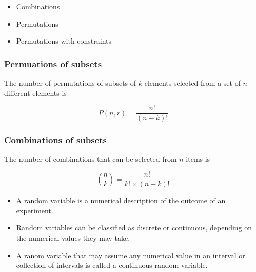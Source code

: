 \documentclass[IntroMain.tex]{subfiles}
\begin{document}
	\begin{frame}
		\begin{itemize}
			\item Combinations
			\item Permutations
			\item Permutations with constraints
		\end{itemize}
		
		
	\end{frame}
	\begin{frame}
		\frametitle{Permuations of subsets}
		
		The number of permutations of subsets of $k$ elements selected from a set of $n$ different elements is
		
		\[P(n,r) = \frac{n!}{(n-k)!}  \]
		
	\end{frame}
	\begin{frame}
		\frametitle{Combinations of subsets}
		
		The number of combinations that can be selected from $n$ items is
		
		\[ {n \choose k} = \frac{n!}{k! \times (n-k)!}  \]
	\end{frame}
	


\begin{frame}
	\begin{itemize}
\item	A random variable is a numerical description of the outcome of an experiment.
	
\item	Random variables can be classified as discrete or continuous, depending on the numerical values they may take.
	
\item	A ranom variable that may assume any numerical value in an interval or collection of intervals is called a continuous random variable.
	\end{itemize}

	
\end{frame}
\end{document}
